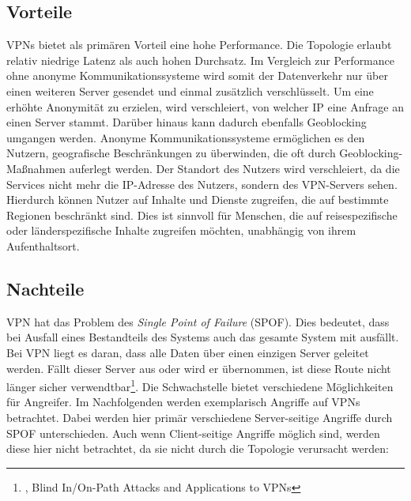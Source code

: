 \subsection{Vorteile}
\label{chap:vpn_advantages}

VPNs bietet als primären Vorteil eine hohe Performance. Die Topologie erlaubt relativ niedrige Latenz als auch hohen Durchsatz. Im Vergleich zur Performance ohne anonyme Kommunikationssysteme wird somit der Datenverkehr nur über einen weiteren Server gesendet und einmal zusätzlich verschlüsselt.
Um eine erhöhte Anonymität zu erzielen, wird verschleiert, von welcher IP eine Anfrage an einen Server stammt. Darüber hinaus kann dadurch ebenfalls Geoblocking umgangen werden. Anonyme Kommunikationssysteme ermöglichen es den Nutzern, geografische Beschränkungen zu überwinden, die oft durch Geoblocking-Maßnahmen auferlegt werden. Der Standort des Nutzers wird verschleiert, da die Services nicht mehr die IP-Adresse des Nutzers, sondern des VPN-Servers sehen. Hierdurch können Nutzer auf Inhalte und Dienste zugreifen, die auf bestimmte Regionen beschränkt sind. Dies ist sinnvoll für Menschen, die auf reisespezifische oder länderspezifische Inhalte zugreifen möchten, unabhängig von ihrem Aufenthaltsort.

\subsection{Nachteile}
\label{chap:vpn_disadvantages}

VPN hat das Problem des \textit{Single Point of Failure} (SPOF). Dies bedeutet, dass bei Ausfall eines Bestandteils des Systems auch das gesamte System mit ausfällt. Bei VPN liegt es daran, dass alle Daten über einen einzigen Server geleitet werden. Fällt dieser Server aus oder wird er übernommen, ist diese Route nicht länger sicher verwendtbar\footnote{\cite{AttacksOnVPNs}, Blind In/On-Path Attacks and Applications to VPNs}.
Die Schwachstelle bietet verschiedene Möglichkeiten für Angreifer. Im Nachfolgenden werden exemplarisch Angriffe auf VPNs betrachtet. Dabei werden hier primär verschiedene Server-seitige Angriffe durch SPOF unterschieden. Auch wenn Client-seitige Angriffe möglich sind, werden diese hier nicht betrachtet, da sie nicht durch die Topologie verursacht werden:

